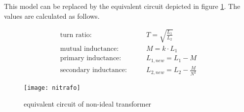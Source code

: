 \addvspace{12pt}

This model can be replaced by the equivalent circuit depicted in
figure \ref{fig:nitrafo}.  The values are calculated as follows.

\begin{align}
\textrm{turn ratio:} & \qquad  T = \sqrt{\frac{L_1}{L_2}}\\
\textrm{mutual inductance:}  & \qquad M = k\cdot L_1\\
\textrm{primary inductance:}  & \qquad L_{1,new} = L_1 - M\\
\textrm{secondary inductance:}  & \qquad L_{2,new} = L_2 - \frac{M}{N^2}
\end{align}

\begin{figure}[ht]
\begin{center}
\texttt{[image: nitrafo]}
\end{center}
\caption{equivalent circuit of non-ideal transformer}
\label{fig:nitrafo}
\end{figure}
\FloatBarrier

